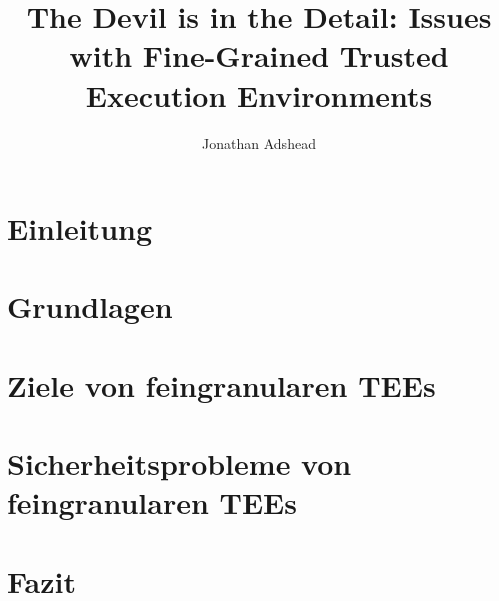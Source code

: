 \documentclass[sigconf]{acmart}
\title{The Devil is in the Detail: Issues with Fine-Grained Trusted Execution Environments}
\author{Jonathan Adshead}
\affiliation{
    \institution{Friedricht-Alexander-Universität Erlangen-Nürnberg}
    \country{}}
\begin{document}
\maketitle  %







\section{Einleitung}


\section{Grundlagen}


\section{Ziele von feingranularen TEEs}


\section{Sicherheitsprobleme von feingranularen TEEs}


\section{Fazit}


\newpage


\end{document}
